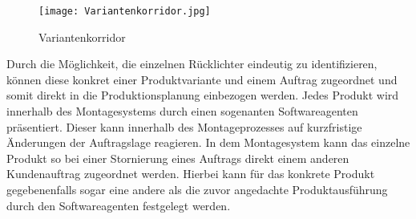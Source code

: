 \begin{figure}[htb] 
\centering
\texttt{[image: Variantenkorridor.jpg]}
\caption[Montagestation]{Variantenkorridor\protect\footnotemark}
\label{fig:Variantenkorridor}
\end{figure}

Durch die Möglichkeit, die einzelnen Rücklichter eindeutig zu identifizieren,
können diese konkret einer Produktvariante und einem Auftrag zugeordnet und
somit direkt in die Produktionsplanung einbezogen werden. Jedes Produkt wird
innerhalb des Montagesystems durch einen sogenanten Softwareagenten
präsentiert. Dieser kann innerhalb des Montageprozesses auf kurzfristige
Änderungen der Auftragslage reagieren. In dem Montagesystem kann das einzelne 
Produkt so bei einer Stornierung eines Auftrags direkt einem anderen
Kundenauftrag zugeordnet werden. Hierbei kann für das konkrete Produkt
gegebenenfalls sogar eine andere als die zuvor angedachte Produktausführung
durch den Softwareagenten festgelegt werden.


